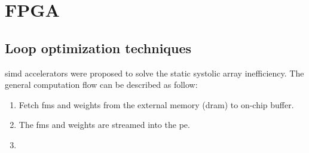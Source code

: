 \chapter{FPGA}
\label{chap:fpga}
\section{Loop optimization techniques} \label{sec:loopopti}
\acrfull{simd} accelerators were proposed to solve the static systolic array inefficiency. The general computation flow can be described as follow:
\begin{enumerate}
    \item Fetch \acrshort{fm}s and weights from the external memory (\acrshort{dram}) to on-chip buffer.
    \item The \acrshort{fm}s and weights are streamed into the \acrshort{pe}.
    \item
\end{enumerate}
